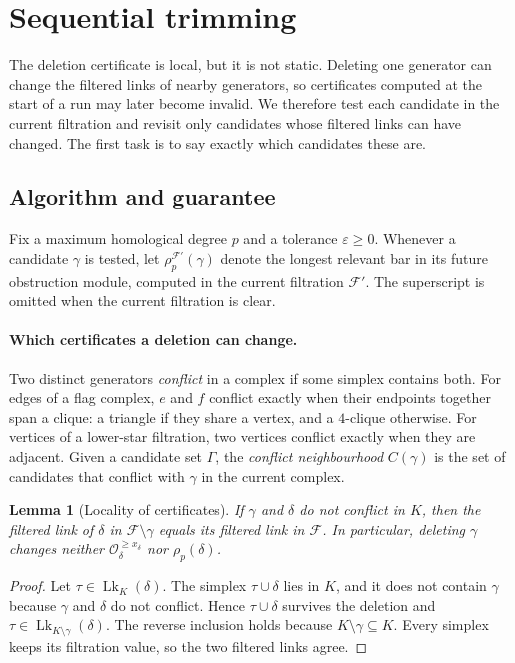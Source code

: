 \documentclass[11pt,letterpaper]{article}
\newtheorem{lemma}[theorem]{Lemma}
\theoremstyle{definition}
\newcommand{\lk}{\operatorname{Lk}}
\newcommand{\Oc}{\mathcal O}
\newcommand{\eps}{\varepsilon}
\begin{document}
\section{Sequential trimming}
\label{sec:algorithm}

The deletion certificate is local, but it is not static. Deleting one
generator can change the filtered links of nearby generators, so certificates
computed at the start of a run may later become invalid. We therefore test
each candidate in the current filtration and revisit only candidates whose
filtered links can have changed. The first task is to say exactly which
candidates these are.

\subsection{Algorithm and guarantee}

Fix a maximum homological degree $p$ and a tolerance $\eps\geq0$. Whenever a
candidate $\gamma$ is tested, let $\rho_p^{\mathcal F'}(\gamma)$ denote the
longest relevant bar in its future obstruction module, computed in the current
filtration $\mathcal F'$. The superscript is omitted when the current
filtration is clear.

\paragraph{Which certificates a deletion can change.}
Two distinct generators \emph{conflict} in a complex if some simplex contains
both. For edges of a flag complex, $e$ and $f$ conflict exactly when their
endpoints together span a clique: a triangle if they share a vertex, and a
$4$-clique otherwise. For vertices of a lower-star filtration, two vertices
conflict exactly when they are adjacent. Given a candidate set $\Gamma$, the
\emph{conflict neighbourhood} $C(\gamma)$ is the set of candidates that
conflict with $\gamma$ in the current complex.

\begin{lemma}[Locality of certificates]
\label{lem:locality}
If $\gamma$ and $\delta$ do not conflict in $K$, then the filtered link of
$\delta$ in $\mathcal F\setminus\gamma$ equals its filtered link in
$\mathcal F$. In particular, deleting $\gamma$ changes neither
$\Oc_\delta^{\geq x_\delta}$ nor $\rho_p(\delta)$.
\end{lemma}

\begin{proof}
Let $\tau\in\lk_K(\delta)$. The simplex $\tau\cup\delta$ lies in $K$, and it
does not contain $\gamma$ because $\gamma$ and $\delta$ do not conflict. Hence
$\tau\cup\delta$ survives the deletion and $\tau\in\lk_{K\setminus\gamma}(\delta)$.
The reverse inclusion holds because $K\setminus\gamma\subseteq K$. Every
simplex keeps its filtration value, so the two filtered links agree.
\end{proof}
\end{document}
